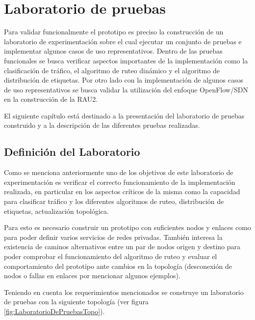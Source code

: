 \chapter{Laboratorio de pruebas}
\label{chapter6}

\ifpdf
    \graphicspath{{Chapter6/Figs/Raster/}{Chapter6/Figs/PDF/}{Chapter6/Figs/}}
\else
    \graphicspath{{Chapter6/Figs/Vector/}{Chapter6/Figs/}}
\fi

Para validar funcionalmente el prototipo es preciso la construcción de un laboratorio de experimentación sobre el cual ejecutar un conjunto de pruebas e implementar algunos casos de uso representativos. Dentro de las pruebas funcionales se busca verificar aspectos importantes de la implementaci\'on como la clasificación de tr\'afico, el algoritmo de ruteo dinámico y el algoritmo de distribución de etiquetas. Por otro lado con la implementaci\'on de algunos casos de uso representativos se busca validar la utilización del enfoque OpenFlow/SDN en la construcci\'on de la RAU2.

El siguiente cap\'itulo est\'a destinado a la presentación del laboratorio de pruebas construido y a la descripción de las diferentes pruebas realizadas.

\section{Definición del Laboratorio}

Como se menciona anteriormente uno de los objetivos de este laboratorio de experimentaci\'on es verificar el correcto funcionamiento de la implementaci\'on realizada, en particular en los aspectos críticos de la misma como la capacidad para clasificar tr\'afico y los diferentes algoritmos de ruteo, distribución de etiquetas, actualización topol\'ogica. 

Para esto es necesario construir un prototipo con suficientes nodos y enlaces como para poder definir varios servicios de redes privadas. Tambi\'en interesa la existencia de caminos alternativos entre un par de nodos origen y destino para poder comprobar el funcionamiento del algoritmo de ruteo y evaluar el comportamiento del prototipo ante cambios en la topolog\'ia (desconexi\'on de nodos o fallas en enlaces por mencionar algunos ejemplos).

Teniendo en cuenta los requerimientos mencionados se construye un laboratorio de pruebas con la siguiente topolog\'ia (ver figura \ref{fig:LaboratorioDePruebasTopo}).
  
